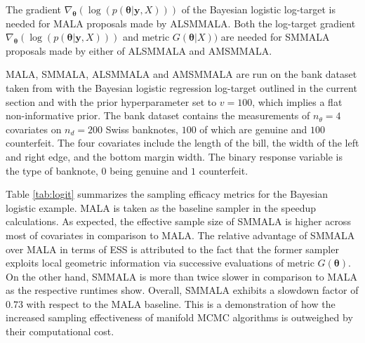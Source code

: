 \documentclass[twoside,11pt]{article}
\begin{document}
The gradient
$\nabla_{\boldsymbol{\theta}}(\log{(p(\boldsymbol{\theta}|\mathbf{y}, X))})$
of the Bayesian logistic log-target is needed for MALA proposals made by ALSMMALA. Both the log-target gradient
$\nabla_{\boldsymbol{\theta}}(\log{(p(\boldsymbol{\theta}|\mathbf{y}, X))})$ and metric
$G(\boldsymbol{\theta}|X))$ are needed for SMMALA proposals made by either of ALSMMALA and AMSMMALA.

MALA, SMMALA, ALSMMALA and AMSMMALA are run on the bank dataset taken from \cite{flu_rie__mul} with the Bayesian logistic 
regression log-target outlined in the current section and with the prior hyperparameter set to $v=100$, which implies a  
flat non-informative prior. The bank dataset contains the measurements of $n_{\theta}=4$ covariates on $n_d=200$ Swiss 
banknotes, $100$ of which are genuine and $100$ counterfeit. The four covariates include the length of the bill, the width 
of the left and right edge, and the bottom margin width. The binary response variable is the type of banknote, $0$ being 
genuine and $1$ counterfeit.

Table \ref{tab:logit} summarizes the sampling efficacy metrics for the Bayesian logistic example. MALA is taken as the 
baseline sampler in the speedup calculations. As expected, the effective sample size of SMMALA is higher across most of 
covariates in comparison to MALA. The relative advantage of SMMALA over MALA in terms of ESS is attributed to the fact that 
the former sampler exploits local geometric information via successive evaluations of metric $G(\boldsymbol{\theta})$. On 
the other hand, SMMALA is more than twice slower in comparison to MALA as the respective runtimes show. Overall, SMMALA
exhibits a slowdown factor of $0.73$ with respect to the MALA baseline. This is a demonstration of how the increased
sampling effectiveness of manifold MCMC algorithms is outweighed by their computational cost.
\end{document}

